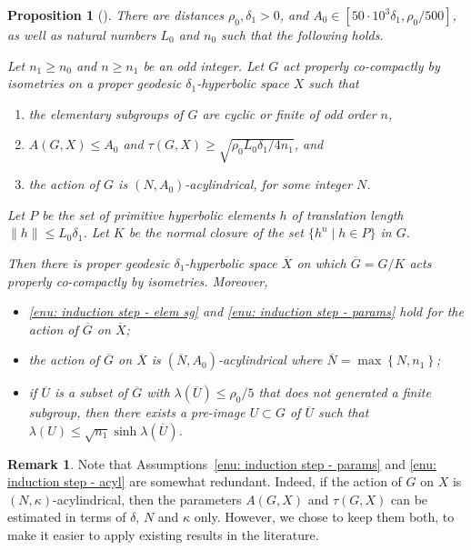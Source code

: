 \documentclass[JEP,XML,SOM,Unicode, NoEqCountersInSection,published]{cedram}
\theoremstyle{plain}
\newtheorem{prop}[thm]{Proposition}
\theoremstyle{definition}
\newtheorem{rem}[thm]{Remark}
\newcommand{\q}[1]{\overline{#1}}
\begin{document}
\begin{prop}[]\label{P: induction step}
There are distances $\rho_0,\delta_1> 0$, and $A_0 \in [50 \cdot 10^3\delta_1, \rho_0/500]$, as well as natural numbers $L_0$ and $n_0$ such that the following holds.

Let $n_1 \geq n_0$ and $n \geq n_1$ be an odd integer.
Let $G$ act properly co-compactly by isometries on a proper geodesic $\delta_1$-hyperbolic space $X$ such that
\begin{enumerate}
\item \label{enu: induction step - elem sg}
the elementary subgroups of $G$ are cyclic or finite of odd order $n$,
\item \label{enu: induction step - params}
$A(G,X)\leqslant A_0$ and $\tau(G,X)\geqslant \sqrt{\rho_0 L_0 \delta_1/4n_1}$, and
\item \label{enu: induction step - acyl}
the action of $G$ is $(N,A_0)$-acylindrical, for some integer $N$.
\end{enumerate}
Let $P$ be the set of primitive hyperbolic elements $h$ of translation length $\|h\|\leqslant L_0 \delta_1$. Let $K$ be the normal closure of the set $\{h^n\mid h\in P\}$ in $G$.

Then there is proper geodesic $\delta_1$-hyperbolic space $\overline{X}$ on which $\overline{G}=G/K$ acts properly co-compactly by isometries. Moreover,
\begin{itemize}
\item \eqref{enu: induction step - elem sg} and \eqref{enu: induction step - params} hold for the action of $\overline{G}$ on $\overline{X}$;
\item the action of $\q G$ on $\q X$ is $(\q N, A_0)$-acylindrical where $\q N = \max\left\{N, n_1\right\}$;
\item if $\q U$ is a subset of $\q G$ with $\lambda(\q U) \leq \rho_0/5$ that does not generated a finite subgroup, then there exists a pre-image $U \subset G$ of $\q U$ such that $\lambda(U) \leq \sqrt{n_1} \sinh \lambda(\q U)$.
\end{itemize}
\end{prop}

\begin{rem}
Note that Assumptions~\eqref{enu: induction step - params} and \eqref{enu: induction step - acyl} are somewhat redundant.
Indeed, if the action of $G$ on $X$ is $(N,\kappa)$-acylindrical, then the parameters $A(G,X)$ and $\tau(G,X)$ can be estimated in terms of $\delta$, $N$ and $\kappa$ only.
However, we chose to keep them both, to make it easier to apply existing results in the literature.
\end{rem}
\end{document}

